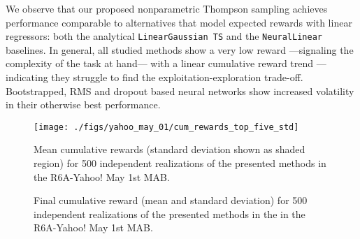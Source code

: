 We observe that our proposed nonparametric Thompson sampling achieves performance comparable to alternatives that model expected rewards with linear regressors: \ie both the analytical \texttt{LinearGaussian TS} and the \texttt{NeuralLinear} baselines. In general, all studied methods show a very low reward ---signaling the complexity of the task at hand--- with a linear cumulative reward trend ---indicating they struggle to find the exploitation-exploration trade-off. Bootstrapped, RMS and dropout based neural networks show increased volatility in their otherwise best performance.

\begin{figure}[!h]
	\centering
	\begin{minipage}{0.45\textwidth}
		\texttt{[image: ./figs/yahoo\_may\_01/cum\_rewards\_top\_five\_std]}
		\caption{Mean cumulative rewards (standard deviation shown as shaded region) for 500 independent realizations of the presented methods in the R6A-Yahoo! May 1st MAB.}
		\label{fig:yahoo_showdown}
	\end{minipage}
	\qquad
	\begin{minipage}{0.48\textwidth}
		\centering
		\captionsetup{type=table}
		\centering
		\caption{Final cumulative reward (mean and standard deviation) for 500 independent realizations of the presented methods in the in the R6A-Yahoo! May 1st MAB.}
		\label{tab:yahoo_showdown}
	\end{minipage}
\end{figure}

